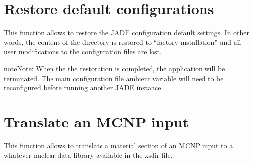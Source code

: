 \documentclass[letterpaper,10pt,english]{sphinxmanual}
\begin{document}
\section{Restore default configurations}
\label{\detokenize{usage/utilities:restore-default-configurations}}

This function allows to restore the JADE configuration default settings.
In other words, the content of the  directory
is restored to “factory installation” and all user modifications to the
configuration files are lost.

\begin{sphinxadmonition}{note}{Note:}
When the the restoration is completed, the application will be terminated.
The main configuration file ambient variable will need to be reconfigured
before running another JADE instance.
\end{sphinxadmonition}




{\hyperref[\detokenize{usage/configuration:mainconfig}]{}}




\section{Translate an MCNP input}
\label{\detokenize{usage/utilities:translate-an-mcnp-input}}

This function allows to translate a material section of an MCNP input to
a whatever nuclear data library available in the xsdir file.
\end{document}
